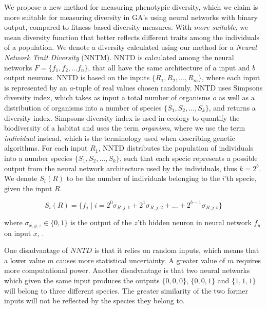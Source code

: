 We propose a new method for measuring phenotypic diversity, which we claim is more suitable for measuring diversity in GA's using neural networks with binary output, compared to fitness based diversity measures. With \emph{more suitable}, we mean diversity function that better reflects different traits among the individuals of a population. 
We denote a diversity calculated using our method for a \emph{Neural Network Trait Diversity} (NNTM).
NNTD is calculated among the neural networks $F = \{f_1, f_2, ... f_n\}$, that all have the same architecture of $a$ input and $b$ output neurons. NNTD is based on the inputs $\{R_1, R_2, ..., R_m\}$, where each input is represented by an $a$-tuple of real values chosen randomly. NNTD uses Simpsons diversity index, which takes as input a total number of organisms $o$ as well as a distribution of organisms into a number of species $\{S_1, S_2, ..., S_k\}$, and returns a diversity index. Simpsons diversity index is used in ecology to quantify the biodiversity of a habitat and uses the term \emph{organism}, where we use the term \emph{individual} instead, which is the terminology used when describing genetic algorithms. 
For each input $R_1$, NNTD distributes the population of individuals into a number species $\{S_1, S_2, ..., S_k\}$, such that  each specie represents a possible output from the neural network architecture used by the individuals, thus $k = 2^b$. We denote $S_i(R)$ to be the number of individuals belonging to the $i$'th specie, given the input $R$.

\[S_i(R) = \{f_j \; | \; i = 2^0\sigma_{R,j,1} + 2^1\sigma_{R,j,2} + ... + 2^{b-1}\sigma_{R,j,b} \}\]

where $\sigma_{x,y,z} \in \{0, 1\}$ is the output of the $z$'th hidden neuron in neural network $f_y$ on input $x$, .

One disadvantage of $NNTD$ is that it relies on random inputs, which means that a lower value $m$ causes more statistical uncertainty. A greater value of $m$ requires more computational power.
Another disadvantage is that two neural networks which given the same input produces the outputs $\{0, 0, 0\}$, $\{0, 0, 1\}$ and $\{1, 1, 1\}$ will belong to three different species. The greater similarity of the two former inputs will not be reflected by the species they belong to.
